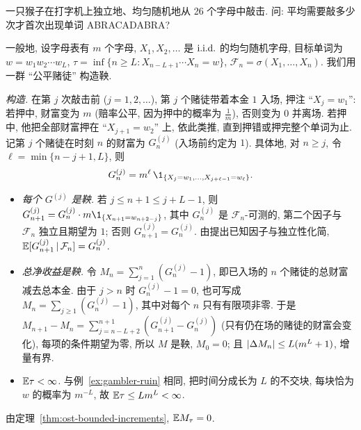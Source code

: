 \begin{example}[ABRACADABRA]\label{ex:abracadabra}
一只猴子在打字机上独立地、均匀随机地从 26 个字母中敲击. 问: 平均需要敲多少次才首次出现单词 ABRACADABRA?

一般地, 设字母表有 $m$ 个字母, $X_1,X_2,\dots$ 是 $\text{i.i.d.}$ 的均匀随机字母, 目标单词为 $w=w_1w_2\cdots w_L$, $\tau=\inf\{n\ge L: X_{n-L+1}\cdots X_n=w\}$, $\mathcal{F}_n=\sigma(X_1,\dots,X_n)$. 我们用一群 ``公平赌徒'' 构造鞅.

\emph{构造.} 在第 $j$ 次敲击前 ($j=1,2,\dots$), 第 $j$ 个赌徒带着本金 $1$ 入场, 押注 ``$X_j=w_1$'': 若押中, 财富变为 $m$ (赔率公平, 因为押中的概率为 $\frac{1}{m}$), 否则变为 $0$ 并离场. 若押中, 他把全部财富押在 ``$X_{j+1}=w_2$'' 上, 依此类推, 直到押错或押完整个单词为止. 记第 $j$ 个赌徒在时刻 $n$ 的财富为 $G^{(j)}_n$ (入场前约定为 $1$). 具体地, 对 $n\ge j$, 令 $\ell=\min\{n-j+1,L\}$, 则
\[
G^{(j)}_n=m^{\ell}\,\1_{\{X_j=w_1,\dots,X_{j+\ell-1}=w_\ell\}}.
\]
\begin{itemize}
\item \emph{每个 $G^{(j)}$ 是鞅.} 若 $j\le n+1\le j+L-1$, 则 $G^{(j)}_{n+1}=G^{(j)}_n\cdot m\1_{\{X_{n+1}=w_{n+2-j}\}}$, 其中 $G^{(j)}_n$ 是 $\mathcal{F}_n$-可测的, 第二个因子与 $\mathcal{F}_n$ 独立且期望为 $1$; 否则 $G^{(j)}_{n+1}=G^{(j)}_n$. 由提出已知因子与独立性化简, $\mathbb{E}[G^{(j)}_{n+1}\,|\,\mathcal{F}_n]=G^{(j)}_n$.
\item \emph{总净收益是鞅.} 令 $M_n=\sum_{j=1}^n(G^{(j)}_n-1)$, 即已入场的 $n$ 个赌徒的总财富减去总本金. 由于 $j>n$ 时 $G^{(j)}_n-1=0$, 也可写成 $M_n=\sum_{j\ge1}(G^{(j)}_n-1)$, 其中对每个 $n$ 只有有限项非零. 于是 $M_{n+1}-M_n=\sum_{j=n-L+2}^{n+1}(G^{(j)}_{n+1}-G^{(j)}_n)$ (只有仍在场的赌徒的财富会变化), 每项的条件期望为零, 所以 $M$ 是鞅, $M_0=0$; 且 $\lvert\Delta M_n\rvert\le L(m^L+1)$, 增量有界.
\item \emph{$\mathbb{E}\tau<\infty$.} 与例~\ref{ex:gambler-ruin} 相同, 把时间分成长为 $L$ 的不交块, 每块恰为 $w$ 的概率为 $m^{-L}$, 故 $\mathbb{E}\tau\le Lm^L<\infty$.
\end{itemize}
由定理~\ref{thm:ost-bounded-increments}, $\mathbb{E} M_\tau=0$.


\end{example}
